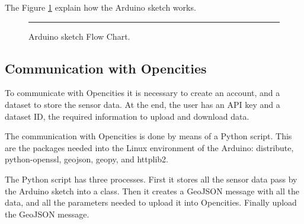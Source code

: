\documentclass[12pt, a4paper,twoside]{tesi_upf}
\begin{document}
      The Figure \ref{fig:Arduino sketch Flow Chart} explain how the Arduino sketch works.\\
      
      \begin{figure}[htbp]
      \centering

      \rule{35em}{0.5pt}
      \caption[Arduino sketch Flow Chart]{Arduino sketch Flow Chart.}
      \label{fig:Arduino sketch Flow Chart}
      \end{figure}
    
    \subsection{Communication with Opencities}
    
      To communicate with Opencities it is necessary to create an account, and a dataset to store the sensor data. At the end, the user has an API key and a dataset ID, the required information to upload and download data. 
      
      The communication with Opencities is done by means of a Python script. This are the packages needed into the Linux environment of the Arduino: distribute, python-openssl, geojson, geopy, and httplib2.
      
      The Python script has three processes. First it stores all the sensor data pass by the Arduino sketch into a class. Then it creates a GeoJSON message with all the data, and all the parameters needed to upload it into Opencities. Finally upload the GeoJSON message.
      
\end{document}
